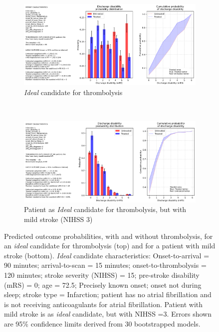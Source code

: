 \begin{figure}[h]
    \centering
    \begin{subfigure}[b]{1.0\textwidth}
        \centering
    \includegraphics[width=1.0\linewidth]{images/prototype_patient_ideal}
        \caption{\textit{Ideal} candidate for thrombolysis}
        \label{fig:patient_outcome_subfig1}
    \end{subfigure}
    \\
    \vspace{8mm}
    \begin{subfigure}[b]{1.0\textwidth}
        \centering
        \includegraphics[width=1.0\linewidth]{images/prototype_patient_mild}
        \caption{Patient as \textit{Ideal} candidate for thrombolysis, but with mild stroke (NIHSS 3)}
        \label{fig:patient_outcome_subfig2}
    \end{subfigure}
    \caption{Predicted outcome probabilities, with and without thrombolysis, for an \textit{ideal} candidate for thrombolysis (top) and for a patient with mild stroke (bottom). \textit{Ideal} candidate characteristics: Onset-to-arrival = 90 minutes; arrival-to-scan = 15 minutes; onset-to-thrombolysis = 120 minutes; stroke severity (NIHSS) = 15; pre-stroke disability (mRS) = 0; age = 72.5; Precisely known onset; onset not during sleep; stroke type = Infarction; patient has no atrial fibrillation and is not receiving anticoagulants for atrial fibrillation. Patient with mild stroke is as \textit{ideal} candidate, but with NIHSS =3. Errors shown are 95\% confidence limits derived from 30 bootstrapped models.}
    \label{fig:example_patient_outcomes}
\end{figure}



